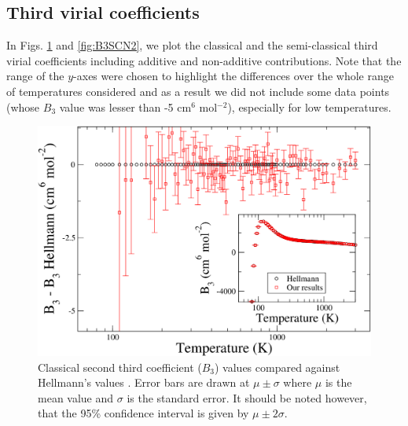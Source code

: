     \subsection{Third virial coefficients}
        In Figs. \ref{fig:B3CLN2} and \ref{fig:B3SCN2}, we plot the classical and the semi-classical third virial coefficients including additive and non-additive contributions. Note that the range of the $y$-axes were chosen to highlight the differences over the whole range of temperatures considered and as a result we did not include some data points (whose $B_3$ value was lesser than -5 cm$^6$ mol$^{-2}$), especially for low temperatures.
        \begin{figure}[!htbp]
            \centering
            \includegraphics[scale=0.20,keepaspectratio]{Chapter-5/Figures/B3CLFull9sResultsAll.png}
            \caption{Classical second third coefficient ($B_3$) values compared against Hellmann's values \cite{Hellmann2013}. Error bars are drawn at $\mu \pm \sigma$ where $\mu$ is the mean value and $\sigma$ is the standard error. It should be noted however, that the 95\% confidence interval is given by $\mu \pm 2\sigma$.}
            \label{fig:B3CLN2}
        \end{figure}

